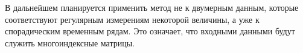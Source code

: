 \documentclass[a4paper, 12pt]{article}
\begin{document}
В дальнейшем планируется применить метод не к двумерным данным, которые соответствуют регулярным измерениям некоторой величины, а уже к спорадическим временным рядам. 
Это означает, что входными данными будут служить многоиндексные матрицы.



\end{document}
